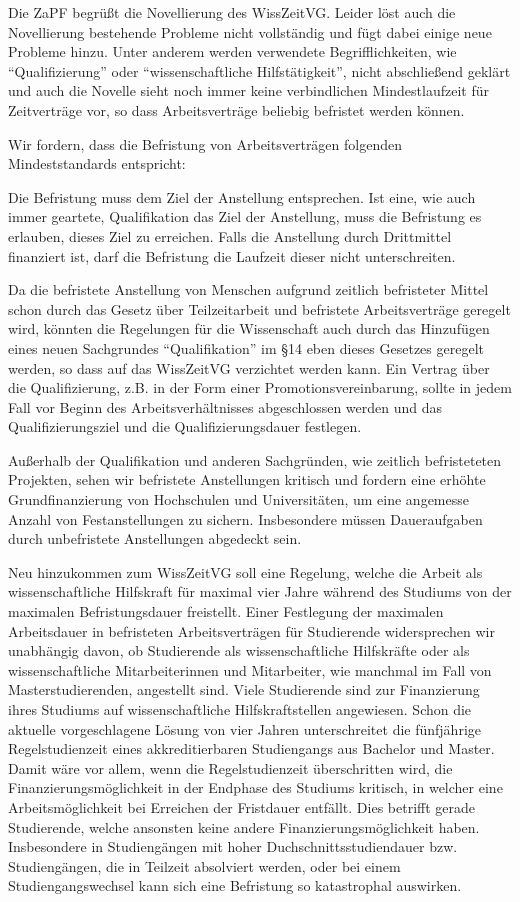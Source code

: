 Die ZaPF begrüßt die Novellierung des WissZeitVG. Leider löst auch die
Novellierung bestehende Probleme nicht vollständig und fügt dabei einige neue
Probleme hinzu. Unter anderem werden verwendete Begrifflichkeiten, wie
``Qualifizierung'' oder  ``wissenschaftliche Hilfstätigkeit'', nicht
abschließend geklärt und auch die Novelle sieht noch immer keine verbindlichen
Mindestlaufzeit für Zeitverträge vor, so dass Arbeitsverträge beliebig
befristet werden können.

Wir fordern, dass die Befristung von Arbeitsverträgen folgenden Mindeststandards
entspricht:

Die Befristung muss dem Ziel der Anstellung entsprechen. Ist eine, wie auch
immer geartete, Qualifikation das Ziel der Anstellung, muss die Befristung es
erlauben, dieses Ziel zu erreichen. Falls die Anstellung durch Drittmittel
finanziert ist, darf die Befristung die Laufzeit dieser nicht unterschreiten.

Da die befristete Anstellung von Menschen aufgrund zeitlich befristeter Mittel
schon durch das Gesetz über Teilzeitarbeit und befristete Arbeitsverträge
geregelt wird, könnten die Regelungen für die Wissenschaft auch durch das
Hinzufügen eines neuen Sachgrundes ``Qualifikation'' im §14 eben dieses
Gesetzes geregelt werden, so dass auf das WissZeitVG verzichtet werden kann.
Ein Vertrag über die Qualifizierung, z.B. in der Form einer
Promotionsvereinbarung, sollte in jedem Fall vor Beginn des
Arbeitsverhältnisses abgeschlossen werden und das Qualifizierungsziel und die
Qualifizierungsdauer festlegen.

Außerhalb der Qualifikation und anderen Sachgründen, wie zeitlich befristeteten
Projekten, sehen wir befristete Anstellungen kritisch und fordern eine erhöhte
Grundfinanzierung von Hochschulen und Universitäten, um eine angemesse Anzahl
von Festanstellungen zu sichern. Insbesondere müssen Daueraufgaben durch
unbefristete Anstellungen abgedeckt sein.

Neu hinzukommen zum WissZeitVG soll eine Regelung, welche die Arbeit als
wissenschaftliche Hilfskraft für maximal vier Jahre während des Studiums von
der maximalen Befristungsdauer freistellt. Einer Festlegung der maximalen
Arbeitsdauer in befristeten Arbeitsverträgen für Studierende widersprechen wir
unabhängig davon, ob Studierende als wissenschaftliche Hilfskräfte oder als
wissenschaftliche Mitarbeiterinnen und Mitarbeiter, wie manchmal im Fall von
Masterstudierenden, angestellt sind. Viele Studierende sind zur Finanzierung
ihres Studiums auf wissenschaftliche Hilfskraftstellen angewiesen. Schon die
aktuelle vorgeschlagene Lösung von vier Jahren unterschreitet die fünfjährige
Regelstudienzeit eines akkreditierbaren Studiengangs aus Bachelor und Master.
Damit wäre vor allem, wenn die Regelstudienzeit überschritten wird, die
Finanzierungsmöglichkeit in der Endphase des Studiums kritisch, in welcher eine
Arbeitsmöglichkeit bei Erreichen der Fristdauer entfällt. Dies betrifft gerade
Studierende, welche ansonsten keine andere Finanzierungsmöglichkeit haben.
Insbesondere in Studiengängen mit hoher Duchschnittsstudiendauer bzw. Studiengängen,
die in Teilzeit absolviert werden, oder bei einem Studiengangswechsel kann sich
eine Befristung so katastrophal auswirken.

